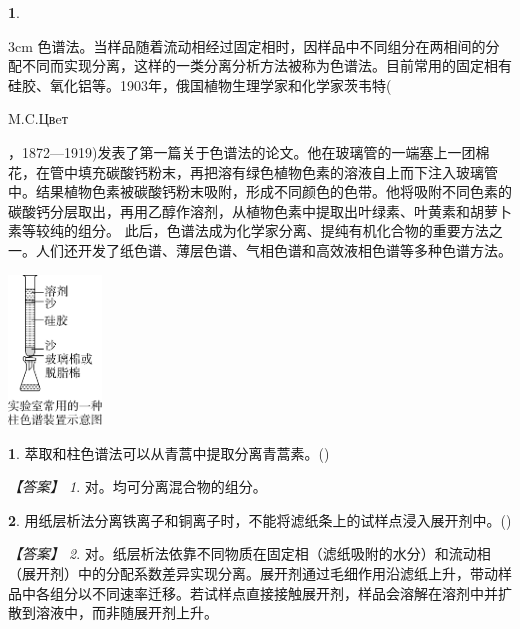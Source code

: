 \documentclass[UTF8, 10pt, a4paper, oneside]{ctexart}
\newcommand{\fs}[1]{{\fangsong #1}}%
\theoremstyle{definition}
\newtheorem{exercise}{}
\newtheorem{subexercise}{}[exercise]%
\theoremstyle{remark}
\newtheorem*{answer}{【答案】}
\theoremstyle{plain}
\begin{document}
\begin{exercise}
    \begin{adjustwidth}{}{3cm}
        色谱法。当样品随着流动相经过固定相时，因样品中不同组分在两相间的分配不同而实现分离，这样的一类分离分析方法被称为色谱法。目前常用的固定相有硅胶、氧化铝等。1903年，俄国植物生理学家和化学家茨韦特(
        \begin{russian}
            M.C.Цвeт
        \end{russian}，1872—1919)发表了第一篇关于色谱法的论文。他在玻璃管的一端塞上一团棉花，在管中填充碳酸钙粉末，再把溶有绿色植物色素的溶液自上而下注入玻璃管中。结果植物色素被碳酸钙粉末吸附，形成不同颜色的色带。他将吸附不同色素的碳酸钙分层取出，再用乙醇作溶剂，从植物色素中提取出叶绿素、叶黄素和胡萝卜素等较纯的组分。  此后，色谱法成为化学家分离、提纯有机化合物的重要方法之一。人们还开发了纸色谱、薄层色谱、气相色谱和高效液相色谱等多种色谱方法。
    \end{adjustwidth}\vspace{-14em}
    \begin{flushright}
        \includegraphics[width=2.5cm, keepaspectratio]{assists/chromatography.png}
    \end{flushright}\vspace{0.5em}

    \begin{subexercise}
        \fs{[2024·湖北卷]}萃取和柱色谱法可以从青蒿中提取分离青蒿素。\quad(\quad)
        \begin{answer}
            对。均可分离混合物的组分。
        \end{answer}
    \end{subexercise}
    \begin{subexercise}
        \fs{[2022·浙江卷]}用纸层析法分离铁离子和铜离子时，不能将滤纸条上的试样点浸入展开剂中。\quad(\quad)
        \begin{answer}
            对。纸层析法依靠不同物质在固定相（滤纸吸附的水分）和流动相（展开剂）中的分配系数差异实现分离。展开剂通过毛细作用沿滤纸上升，带动样品中各组分以不同速率迁移。若试样点直接接触展开剂，样品会溶解在溶剂中并扩散到溶液中，而非随展开剂上升。
        \end{answer}
    \end{subexercise}
\end{exercise}
\end{document}
